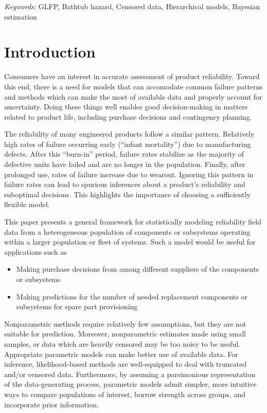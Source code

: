 \documentclass[aap]{imsart}
\begin{document}
\noindent%
{\it Keywords:} GLFP, Bathtub hazard, Censored data, Hierarchical models, Bayesian estimation
\vfill

\newpage
\newpage
{} %
\section{Introduction}
Consumers have an interest in accurate assessment of product reliability. Toward this end, there is a need for models that can accomodate common failure patterns and methods which can make the most of available data and properly account for uncertainty. Doing these things well enables good decision-making in matters related to product life, including purchase decisions and contingency planning.

The reliability of many engineered products follow a similar pattern. Relatively high rates of failure occurring early (``infant mortality'') due to manufacturing defects.  After this ``burn-in'' period, failure rates stabilize as the majority of defective units have failed and are no longer in the population.  Finally, after prolonged use, rates of failure increase due to wearout.  Ignoring this pattern in failure rates can lead to spurious inferences about a product's reliability and suboptimal decisions. This highlights the importance of choosing a sufficiently flexible model.



This paper presents a general framework for statistically modeling reliability field data from a heterogeneous population of components or subsystems operating within a larger population or fleet of systems. Such a model would be useful for applications such as

\begin{itemize}
\item Making purchase decisions from among different suppliers of the components or subsystems
\item Making predictions for the number of needed replacement components or subsystems for spare part provisioning
\end{itemize}

Nonparametric methods require relatively few assumptions, but they are not suitable for prediction. Moreover, nonparametric estimates made using small samples, or data which are heavily censored may be too noisy to be useful. Appropriate parametric models can make better use of available data. For inference, likelihood-based methods are well-equipped to deal with truncated and/or censored data. Furthermore, by assuming a parsimonious representation of the data-generating process, parametric models admit simpler, more intuitive ways to compare populations of interest, borrow strength across groups, and incorporate prior information. 
\end{document}
